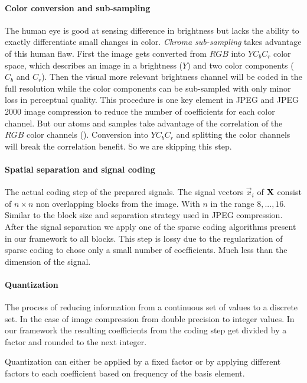 \paragraph{Color conversion and sub-sampling} The human eye is good at sensing
difference in brightness but lacks the ability to exactly differentiate small
changes in color. \emph{Chroma sub-sampling} takes advantage of this human flaw.
First the image gets converted from $RGB$ into $YC_bC_r$ color space, which
describes an image in a brightness ($Y$) and two color components ($C_b$ and
$C_r$). Then the visual more relevant brightness channel will be coded in
the full resolution while the color components can be sub-sampled with
only minor loss in perceptual quality. This procedure is one key element in JPEG
and JPEG 2000 image compression to reduce the number of coefficients for each
color channel. 
But our atoms and samples take advantage of the correlation of the $RGB$ color
channels (). Conversion into $YC_bC_r$ and
splitting the color channels will break the correlation benefit. So we are
skipping this step.  

\paragraph{Spatial separation and signal coding}
The actual coding step of the prepared signals. The signal vectors $\vec{x}_i$
of $\boldsymbol{\mathrm{X}}$ consist of $n \times n$ non overlapping blocks from the image.
With $n$ in the range $8,...,16$. Similar to the block size and separation
strategy used in JPEG compression. After the signal separation we apply one
of the sparse coding algorithms present in our framework to all blocks. This
step is lossy due to the regularization of sparse coding to chose only a small
number of coefficients. Much less than the dimension of the signal. 

\paragraph{Quantization}  The process of reducing information from a
continuous set of values to a discrete set. In the case of image compression
from double precision to integer values. In our framework the resulting
coefficients from the coding step get divided by a factor and rounded to the
next integer.  

Quantization can either be applied by a fixed factor or by applying different 
factors to each coefficient based on frequency of the basis element.

